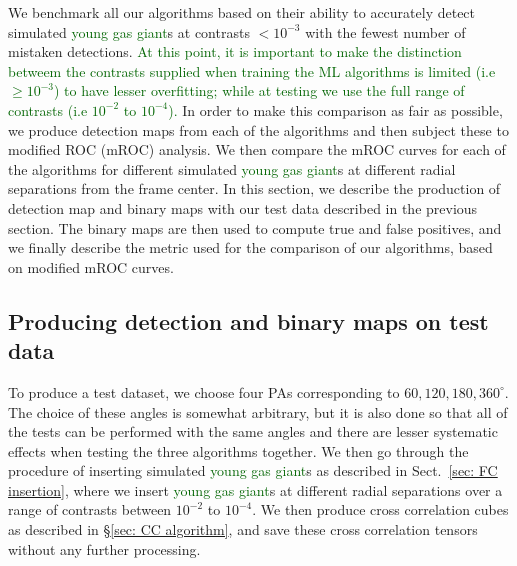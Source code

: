 \documentclass{aa}
\newcommand{\newchange}[1]{\textcolor{darkgreen}{#1}}
\begin{document}
We benchmark all our algorithms based on their ability to accurately detect simulated \newchange{young gas giant}s at contrasts $<10^{-3}$ with the fewest number of mistaken detections.
\newchange{At this point, it is important to make the distinction betweem the contrasts supplied when training the ML algorithms is limited (i.e $\ge 10^{-3}$) to have lesser overfitting; while at testing we use the full range of contrasts (i.e $10^{-2}$ to $10^{-4}$).}
In order to make this comparison as fair as possible, we produce detection maps from each of the algorithms and then subject these to modified ROC (mROC) analysis.
We then compare the mROC curves for each of the algorithms for different simulated \newchange{young gas giant}s at different radial separations from the frame center.
In this section, we describe the production of detection map and binary maps with our test data described in the previous section.
The binary maps are then used to compute true and false positives, and we finally describe the metric used for the comparison of our algorithms, based on modified mROC curves.


\subsection{Producing detection and binary maps on test data}\label{sec:testdata}

To produce a test dataset, we choose four PAs corresponding to $60,120,180,360^{\circ}$.
The choice of these angles is somewhat arbitrary, but it is also done so that all of the tests can be performed with the same angles and there are lesser systematic effects when testing the three algorithms together.
We then go through the procedure of inserting simulated \newchange{young gas giant}s as described in Sect.~\ref{sec: FC insertion}, where we insert \newchange{young gas giant}s at different radial separations over a range of contrasts between $10^{-2}$ to $10^{-4}$. We then produce cross correlation cubes as described in \S\ref{sec: CC algorithm}, and save these cross correlation tensors without any further processing.
\end{document}
